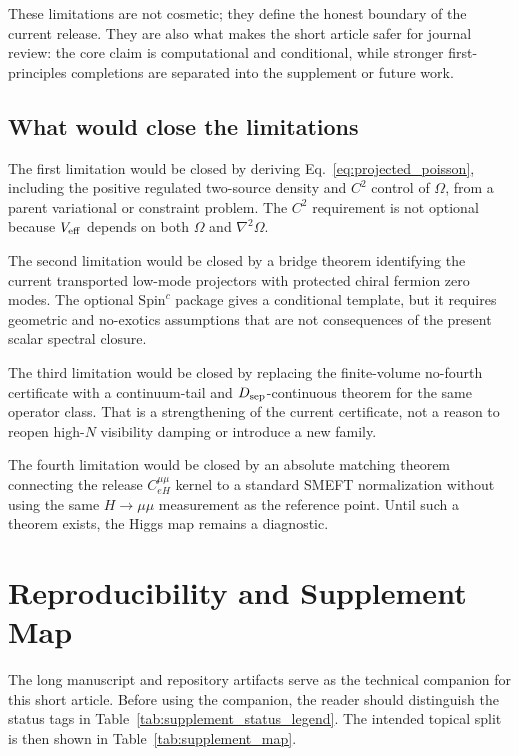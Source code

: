 \documentclass[11pt,a4paper]{article}
\begin{document}
These limitations are not cosmetic; they define the honest boundary of the current release.
They are also what makes the short article safer for journal review: the core claim is computational and conditional, while stronger first-principles completions are separated into the supplement or future work.

\subsection{What would close the limitations}

The first limitation would be closed by deriving Eq.~\eqref{eq:projected_poisson}, including the positive regulated two-source density and \(C^2\) control of \(\Omega\), from a parent variational or constraint problem.
The \(C^2\) requirement is not optional because \(V_{\rm eff}\) depends on both \(\Omega\) and \(\nabla^2\Omega\).

The second limitation would be closed by a bridge theorem identifying the current transported low-mode projectors with protected chiral fermion zero modes.
The optional \(\mathrm{Spin}^c\) package gives a conditional template, but it requires geometric and no-exotics assumptions that are not consequences of the present scalar spectral closure.

The third limitation would be closed by replacing the finite-volume no-fourth certificate with a continuum-tail and \(D_{\rm sep}\)-continuous theorem for the same operator class.
That is a strengthening of the current certificate, not a reason to reopen high-\(N\) visibility damping or introduce a new family.

The fourth limitation would be closed by an absolute matching theorem connecting the release \(C_{eH}^{\mu\mu}\) kernel to a standard SMEFT normalization without using the same \(H\to\mu\mu\) measurement as the reference point.
Until such a theorem exists, the Higgs map remains a diagnostic.

\section{Reproducibility and Supplement Map}
\label{sec:repro}

The long manuscript and repository artifacts serve as the technical companion for this short article.
Before using the companion, the reader should distinguish the status tags in Table~\ref{tab:supplement_status_legend}.
The intended topical split is then shown in Table~\ref{tab:supplement_map}.
\end{document}
